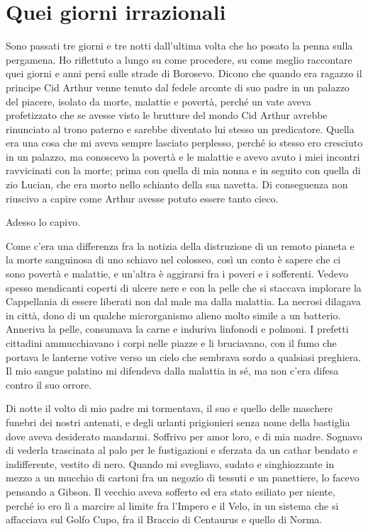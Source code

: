 \chapter{Quei giorni irrazionali}

Sono passati tre giorni e tre notti dall'ultima volta che ho posato la
penna sulla pergamena. Ho riflettuto a lungo su come procedere, su come
meglio raccontare quei giorni e anni persi sulle strade di Borosevo.
Dicono che quando era ragazzo il principe Cid Arthur venne tenuto dal
fedele arconte di suo padre in un palazzo del piacere, isolato da morte,
malattie e povertà, perché un vate aveva profetizzato che se avesse
visto le brutture del mondo Cid Arthur avrebbe rinunciato al trono
paterno e sarebbe diventato lui stesso un predicatore. Quella era una
cosa che mi aveva sempre lasciato perplesso, perché io stesso ero
cresciuto in un palazzo, ma conoscevo la povertà e le malattie e avevo
avuto i miei incontri ravvicinati con la morte; prima con quella di mia
nonna e in seguito con quella di zio Lucian, che era morto nello
schianto della sua navetta. Di conseguenza non riuscivo a capire come
Arthur avesse potuto essere tanto cieco.

Adesso lo capivo.

Come c'era una differenza fra la notizia della distruzione di un remoto
pianeta e la morte sanguinosa di uno schiavo nel colosseo, così un conto
è sapere che ci sono povertà e malattie, e un'altra è aggirarsi fra i
poveri e i sofferenti. Vedevo spesso mendicanti coperti di ulcere nere e
con la pelle che si staccava implorare la Cappellania di essere liberati
non dal male ma dalla malattia. La necrosi dilagava in città, dono di un
qualche microrganismo alieno molto simile a un batterio. Anneriva la
pelle, consumava la carne e induriva linfonodi e polmoni. I prefetti
cittadini ammucchiavano i corpi nelle piazze e li bruciavano, con il
fumo che portava le lanterne votive verso un cielo che sembrava sordo a
qualsiasi preghiera. Il mio sangue palatino mi difendeva dalla malattia
in sé, ma non c'era difesa contro il suo orrore.

Di notte il volto di mio padre mi tormentava, il suo e quello delle
maschere funebri dei nostri antenati, e degli urlanti prigionieri senza
nome della bastiglia dove aveva desiderato mandarmi. Soffrivo per amor
loro, e di mia madre. Sognavo di vederla trascinata al palo per le
fustigazioni e sferzata da un cathar bendato e indifferente, vestito di
nero. Quando mi svegliavo, sudato e singhiozzante in mezzo a un mucchio
di cartoni fra un negozio di tessuti e un panettiere, lo facevo pensando
a Gibson. Il vecchio aveva sofferto ed era stato esiliato per niente,
perché io ero lì a marcire al limite fra l'Impero e il Velo, in un
sistema che si affacciava sul Golfo Cupo, fra il Braccio di Centaurus e
quello di Norma.

